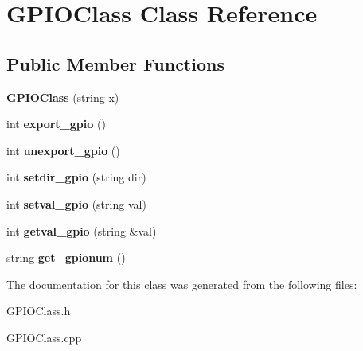 \hypertarget{classGPIOClass}{}\section{G\+P\+I\+O\+Class Class Reference}
\label{classGPIOClass}
\subsection*{Public Member Functions}
\begin{DoxyCompactItemize}
\item 
{\bfseries G\+P\+I\+O\+Class} (string x)\hypertarget{classGPIOClass_a6578c36830f2e62334fcc5ccb489a7cb}{}\label{classGPIOClass_a6578c36830f2e62334fcc5ccb489a7cb}

\item 
int {\bfseries export\+\_\+gpio} ()\hypertarget{classGPIOClass_a08ed267741cb5419fb31eb50cc44dad2}{}\label{classGPIOClass_a08ed267741cb5419fb31eb50cc44dad2}

\item 
int {\bfseries unexport\+\_\+gpio} ()\hypertarget{classGPIOClass_aa1a4bf427bed8843171613b439f594bf}{}\label{classGPIOClass_aa1a4bf427bed8843171613b439f594bf}

\item 
int {\bfseries setdir\+\_\+gpio} (string dir)\hypertarget{classGPIOClass_a51bafa7393d411f32ababfab1cf2852a}{}\label{classGPIOClass_a51bafa7393d411f32ababfab1cf2852a}

\item 
int {\bfseries setval\+\_\+gpio} (string val)\hypertarget{classGPIOClass_a548c98646daa503029a2cd9f8782a6ae}{}\label{classGPIOClass_a548c98646daa503029a2cd9f8782a6ae}

\item 
int {\bfseries getval\+\_\+gpio} (string \&val)\hypertarget{classGPIOClass_a56b8e3f86419ef319e91847ab2ca1ec1}{}\label{classGPIOClass_a56b8e3f86419ef319e91847ab2ca1ec1}

\item 
string {\bfseries get\+\_\+gpionum} ()\hypertarget{classGPIOClass_a1ebffcb1b82454f8e6648c7e9ad45659}{}\label{classGPIOClass_a1ebffcb1b82454f8e6648c7e9ad45659}

\end{DoxyCompactItemize}


The documentation for this class was generated from the following files\+:\begin{DoxyCompactItemize}
\item 
G\+P\+I\+O\+Class.\+h\item 
G\+P\+I\+O\+Class.\+cpp\end{DoxyCompactItemize}
